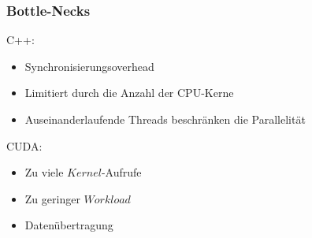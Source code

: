 \documentclass[xcolor=pdftex,dvipsnames,table]{beamer}
\begin{document}
\begin{frame}
\begin{columns}
\begin{column}{0.5\textwidth}
\begin{figure}[htbp]
\begin{figure}[htbp]
\begin{minipage}{1\textwidth}
					\end{minipage}
				\end{figure}
			\end{figure}
		\end{column}
	\end{columns}
	
\end{frame}

\begin{frame}
	\frametitle{Bottle-Necks}
		C++:
		\begin{itemize}
			\item Synchronisierungsoverhead 
			\item Limitiert durch die Anzahl der CPU-Kerne
			\item Auseinanderlaufende Threads beschränken die Parallelität
		\end{itemize}
	
	
		CUDA:
		\begin{itemize}
			\item Zu viele $Kernel$-Aufrufe
			\item Zu geringer $Workload$
			\item Datenübertragung			
		\end{itemize}
\end{frame}
\end{document}
